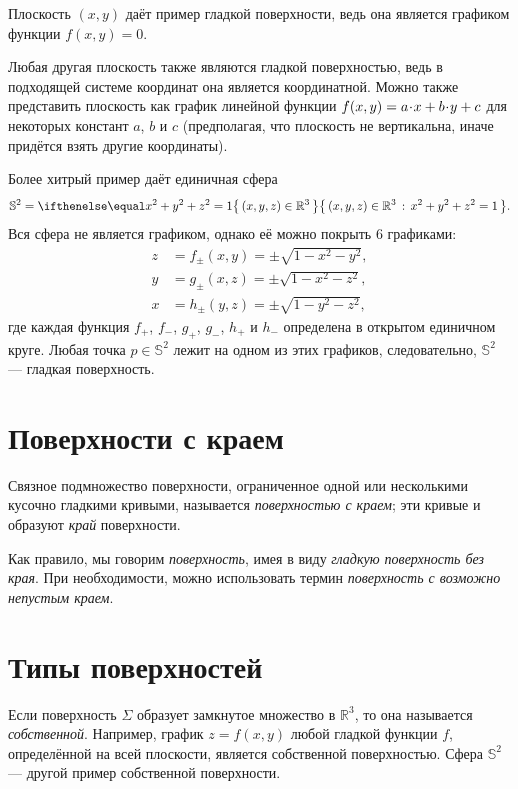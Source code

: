 Плоскость $(x,y)$
даёт пример гладкой поверхности, ведь она является графиком функции $f(x,y)=0$.

Любая другая плоскость также являются гладкой поверхностью, ведь в подходящей системе координат  она является координатной.
Можно также представить плоскость как график линейной функции 
$f(x,y)\z=a\cdot x+b\cdot y+c$ для некоторых констант $a$, $b$ и $c$
(предполагая, что плоскость не вертикальна, иначе придётся взять другие координаты).

Более хитрый пример даёт единичная сфера 
\[\mathbb{S}^2=\set{(x,y,z)\in\mathbb{R}^3}{x^2+y^2+z^2=1}.\]
Вся сфера не является графиком,
однако её можно покрыть 6 графиками:
\begin{align*}
z&=f_\pm(x,y)=\pm \sqrt{1-x^2-y^2},
\\
y&=g_\pm(x,z)=\pm \sqrt{1-x^2-z^2},
\\
x&=h_\pm(y,z)=\pm \sqrt{1-y^2-z^2},
\end{align*}
где каждая функция $f_+$, $f_-$, $g_+$, $g_-$, $h_+$ и $h_-$ определена в открытом единичном круге.
Любая точка $p\in\mathbb{S}^2$ лежит на одном из этих графиков, следовательно, $\mathbb{S}^2$ --- гладкая  поверхность.

\section{Поверхности с краем}

{\sloppy

Связное подмножество поверхности, ограниченное одной или несколькими кусочно гладкими кривыми, называется \emph{поверхностью с краем}; эти кривые и образуют \emph{край} поверхности.

}

Как правило, мы говорим {}\emph{поверхность}, имея в виду {}\emph{гладкую поверхность без края}.
При необходимости, можно использовать термин {}\emph{поверхность с возможно непустым краем}.


\section{Типы поверхностей}

Если поверхность $\Sigma$ образует замкнутое множество в $\mathbb{R}^3$, то она называется \emph{собственной}.
Например, график $z=f(x,y)$ любой гладкой функции $f$, определённой на всей плоскости, является собственной поверхностью.
Сфера $\mathbb{S}^2$ --- другой пример собственной поверхности.


